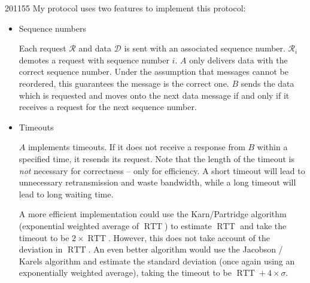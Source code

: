 \documentclass[10pt,\jkfside,a4paper]{article}
\begin{document}
\begin{examquestion}{2011}{5}{5}
My protocol uses two features to implement this protocol:
\begin{itemize}

\item Sequence numbers

Each request $\mathcal R$ and data $\mathcal D$ is sent with an associated
sequence number. $\mathcal R_i$ demotes a request with sequence number $i$.
$A$ only delivers data with the correct sequence number. Under the
assumption that messages cannot be reordered, this guarantees the message is
the correct one. $B$ sends the data which is requested and moves onto the
next data message if and only if it receives a request for the next sequence
number.

\item Timeouts

$A$ implements timeouts. If it does not receive a response from $B$ within a
specified time, it resends its request. Note that the length of the timeout
is \textit{not} necessary for correctness -- only for efficiency. A short
timeout will lead to unnecessary retransmission and waste bandwidth, while a
long timeout will lead to long waiting time.

A more efficient implementation could use the Karn/Partridge algorithm
(exponential weighted average of $\mathop{RTT}$) to estimate $\mathop{RTT}$
and take the timeout to be $2 \times \mathop{RTT}$. However, this does not
take account of the deviation in $\mathop{RTT}$. An even better algorithm
would use the Jacobson / Karels algorithm and estimate the standard
deviation (once again using an exponentially weighted average), taking the
timeout to be $\mathop{RTT} + 4 \times \sigma$.

\end{itemize}

\end{examquestion}
\end{document}
